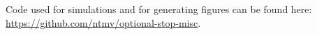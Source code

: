 \documentclass{article}
\begin{document}
Code used for simulations and for generating figures can be found here: \url{https://github.com/ntmv/optional-stop-misc}.






\end{document}
